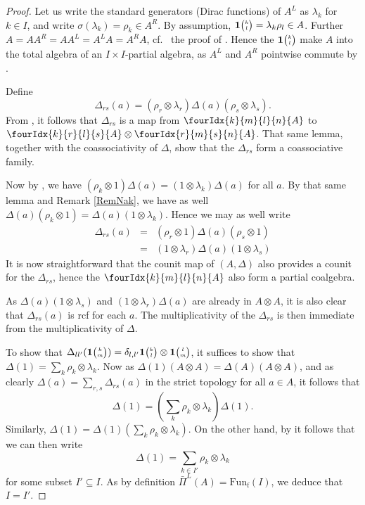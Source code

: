 \documentclass[10pt]{article}
\DeclareMathOperator{\fin}{\mathrm{f}}
\newcommand{\Fun}{\mathrm{Fun}}
\newcommand{\Grt}[3]{#1{\tiny{\begin{pmatrix} #2\\#3\end{pmatrix}}}}
\newcommand{\UnitC}[2]{\Grt{\mathbf{1}}{#1}{#2}}
\newcommand{\Gr}[5]{\fourIdx{#2}{#4}{#3}{#5}{#1}}%
\theoremstyle{definition}
\numberwithin{equation}{section}
\begin{document}
\begin{proof} Let us write the standard generators (Dirac functions) of $A^L$ as $\lambda_k$ for $k\in I$, and write $\sigma(\lambda_k) = \rho_k\in A^R$. By assumption, $\UnitC{k}{l} = \lambda_k\rho_l\in A$. Further $A= AA^R = AA^L = A^LA=A^RA$, cf.~ the proof of \cite[Theorem 3.13]{Boh1}. Hence the $\UnitC{k}{l}$ make $A$ into the total algebra of an $I\times I$-partial algebra, as $A^L$ and $A^R$ pointwise commute by \cite[Lemma 3.5]{Boh1}. 

Define \[\Delta_{rs}(a) = (\rho_r\otimes \lambda_r)\Delta(a)(\rho_s\otimes \lambda_s).\] From \cite[Lemma 3.3]{Boh1}, it follows that $\Delta_{rs}$ is a map from $\Gr{A}{k}{l}{m}{n}$ to $\Gr{A}{k}{l}{r}{s}\otimes \Gr{A}{r}{s}{m}{n}$. That same lemma, together with the coassociativity of $\Delta$, show that the $\Delta_{rs}$ form a coassociative family.  

Now by \cite[Lemma 3.9]{Boh1}, we have $(\rho_k\otimes 1)\Delta(a) = (1\otimes \lambda_k)\Delta(a)$ for all $a$. By that same lemma and Remark \ref{RemNak}, we have as well $\Delta(a)(\rho_k\otimes 1) = \Delta(a)(1\otimes \lambda_k)$. Hence we may as well write \begin{eqnarray*} \Delta_{rs}(a) &=& (\rho_r\otimes 1)\Delta(a)(\rho_s\otimes 1) \\ &=& (1\otimes \lambda_r)\Delta(a)(1\otimes \lambda_s)\end{eqnarray*}  It is now straightforward that the counit map of $(A,\Delta)$ also provides a counit for the $\Delta_{rs}$, hence the $\Gr{A}{k}{l}{m}{n}$ also form a partial coalgebra. 

As $\Delta(a)(1\otimes \lambda_s)$ and $(1\otimes \lambda_r)\Delta(a)$ are already in $A\otimes A$, it is also clear that $\Delta_{rs}(a)$ is rcf for each $a$. The multiplicativity of the $\Delta_{rs}$ is then immediate from the multiplicativity of $\Delta$.

To show that $\Delta_{ll'}(\UnitC{k}{m}) = \delta_{l,l'} \UnitC{k}{l}\otimes \UnitC{l}{m}$, it suffices to show that $\Delta(1) = \sum_k \rho_k\otimes \lambda_k$. Now as $\Delta(1)(A\otimes A)  = \Delta(A)(A\otimes A)$, and as clearly $\Delta(a) = \sum_{r,s}\Delta_{rs}(a)$ in the strict topology for all $a\in A$, it follows that \[\Delta(1) = \left(\sum_k \rho_k\otimes \lambda_k\right)\Delta(1).\]  Similarly, $\Delta(1) = \Delta(1)\left(\sum_k\rho_k\otimes \lambda_k\right)$. On the other hand, by \cite[Lemma 4.10]{Boh1} it follows that we can then write \[\Delta(1) = \sum_{k\in I'} \rho_k\otimes \lambda_k\] for some subset $I'\subseteq I$. As by definition $\bar{\Pi}^L(A) = \Fun_{\fin}(I)$, we deduce that $I=I'$. 


\end{proof}
\end{document}
